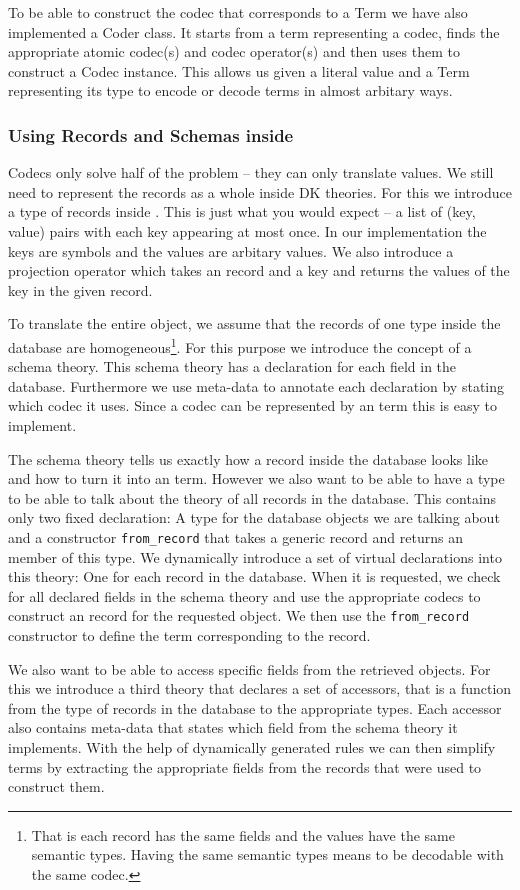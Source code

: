To be able to construct the codec that corresponds to a Term we have also implemented a
Coder class. It starts from a term representing a codec, finds the
appropriate atomic codec(s) and codec operator(s) and then uses them to construct a Codec
instance. This allows us given a literal value and a Term representing its type to encode
or decode terms in almost arbitary ways.

\subsubsection{Using Records and Schemas inside \MMT}

Codecs only solve half of the problem -- they can only translate values. We still need to
represent the records as a whole inside DK theories. For this we introduce a type of
records inside \MMT. This is just what you would expect -- a list of (key, value) pairs
with each key appearing at most once. In our implementation the keys are \MMT symbols and
the values are arbitary \MMT values. We also introduce a projection operator which takes
an \MMT record and a key and returns the values of the key in the given record.

To translate the entire object, we assume that the records of one type inside the database
are homogeneous\footnote{That is each record has the same fields and the values have the
  same semantic types. Having the same semantic types means to be decodable with the same
  codec. }. For this purpose we introduce the concept of a schema theory. This schema
theory has a declaration for each field in the database. Furthermore we use meta-data to
annotate each declaration by stating which codec it uses. Since a codec can be represented
by an \MMT term this is easy to implement.

The schema theory tells us exactly how a record inside the database looks like and how to
turn it into an \MMT term. However we also want to be able to have a type to be able to
talk about the theory of all records in the database. This contains only two fixed
declaration: A type for the database objects we are talking about and a constructor
\texttt{from\_record} that takes a generic
record and returns an member of this type. We dynamically introduce a set of virtual
declarations into this theory: One for each record in the database. When it is requested,
we check for all declared fields in the schema theory and use the appropriate codecs to
construct an \MMT record for the requested object. We then use the \texttt{from\_record}
constructor to define the \MMT term corresponding to the record.

We also want to be able to access specific fields from the retrieved objects. For this we
introduce a third theory that declares a set of accessors, that is a function from the
type of records in the database to the appropriate types. Each accessor also contains
meta-data that states which field from the schema theory it implements. With the help of
dynamically generated rules we can then simplify terms by extracting the appropriate
fields from the records that were used to construct them.

